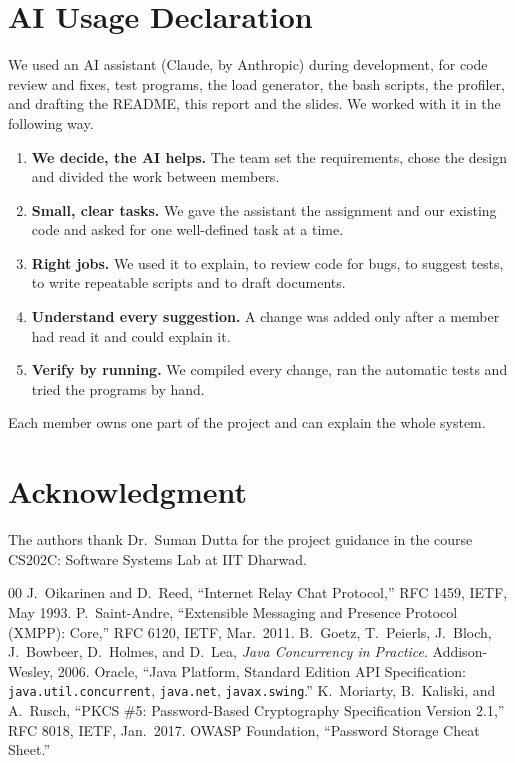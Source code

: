 \documentclass[conference]{IEEEtran}
\begin{document}
\section*{AI Usage Declaration}
We used an AI assistant (Claude, by Anthropic) during development, for code review and fixes, test programs, the load generator, the bash scripts, the profiler, and drafting the README, this report and the slides.
We worked with it in the following way.
\begin{enumerate}
\item \textbf{We decide, the AI helps.} The team set the requirements, chose the design and divided the work between members.
\item \textbf{Small, clear tasks.} We gave the assistant the assignment and our existing code and asked for one well-defined task at a time.
\item \textbf{Right jobs.} We used it to explain, to review code for bugs, to suggest tests, to write repeatable scripts and to draft documents.
\item \textbf{Understand every suggestion.} A change was added only after a member had read it and could explain it.
\item \textbf{Verify by running.} We compiled every change, ran the automatic tests and tried the programs by hand.
\end{enumerate}
Each member owns one part of the project and can explain the whole system.

\section*{Acknowledgment}
The authors thank Dr.\ Suman Dutta for the project guidance in the course CS202C: Software Systems Lab at IIT Dharwad.

\balance
\begin{thebibliography}{00}
 J.~Oikarinen and D.~Reed, ``Internet Relay Chat Protocol,'' RFC 1459, IETF, May 1993.
 P.~Saint-Andre, ``Extensible Messaging and Presence Protocol (XMPP): Core,'' RFC 6120, IETF, Mar.\ 2011.
 B.~Goetz, T.~Peierls, J.~Bloch, J.~Bowbeer, D.~Holmes, and D.~Lea, \emph{Java Concurrency in Practice}. Addison-Wesley, 2006.
 Oracle, ``Java Platform, Standard Edition API Specification: \texttt{java.util.concurrent}, \texttt{java.net}, \texttt{javax.swing}.''
 K.~Moriarty, B.~Kaliski, and A.~Rusch, ``PKCS \#5: Password-Based Cryptography Specification Version 2.1,'' RFC 8018, IETF, Jan.\ 2017.
 OWASP Foundation, ``Password Storage Cheat Sheet.''
\end{thebibliography}
\end{document}
